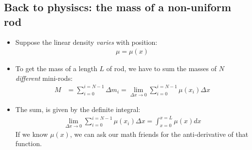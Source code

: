 \documentclass[aspectratio=169,
hyperref={colorlinks,urlcolor=blue}
]{beamer}
\begin{document}
\subsection{Back to physiscs: the mass of a non-uniform rod}
\label{subsec:btpnonunirodmass}
{
\begin{itemize}
\scriptsize
\item Suppose the linear density \emph{varies} with position:
\begin{align*}
\mu = \mu(x)
\end{align*}
\item To get the mass of a length $L$ of rod, we have to sum the masses of $N$ \emph{different} mini-rods:
\begin{align*}
M &=\sum_{i=0}^{i=N-1}\Delta m_i =\lim_{\Delta x\to 0} \sum_{i=0}^{i=N-1} \mu(x_i) \Delta x
\end{align*}
\item The sum, is given by the definite integral:
\begin{align*}
\lim_{\Delta x\to 0} \sum_{i=0}^{i=N-1} \mu(x_i) \Delta x=\int_{x=0}^{x=L}\mu(x)dx
\end{align*}
If we know $\mu(x)$, we can ask our math friends for the anti-derivative of that function.
\end{itemize}

}
\end{document}
